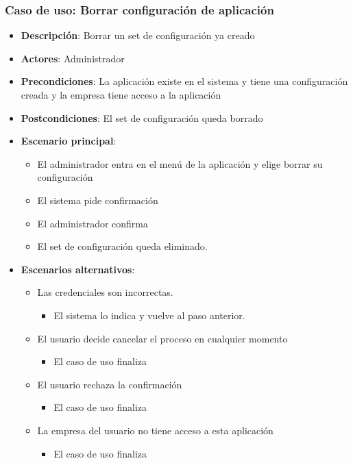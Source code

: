 \documentclass[12pt,a4paperpaper,]{report}
\providecommand{\tightlist}{%
  \setlength{\itemsep}{0pt}\setlength{\parskip}{0pt}}
\begin{document}
\subsubsection{Caso de uso: Borrar configuración de
aplicación}\label{caso-de-uso-borrar-configuraciuxf3n-de-aplicaciuxf3n-1}

\begin{itemize}
\tightlist
\item
  \textbf{Descripción}: Borrar un set de configuración ya creado
\item
  \textbf{Actores}: Administrador
\item
  \textbf{Precondiciones}: La aplicación existe en el sistema y tiene
  una configuración creada y la empresa tiene acceso a la aplicación
\item
  \textbf{Postcondiciones}: El set de configuración queda borrado
\item
  \textbf{Escenario principal}:

  \begin{itemize}
  \tightlist
  \item
    El administrador entra en el menú de la aplicación y elige borrar su
    configuración
  \item
    El sistema pide confirmación
  \item
    El administrador confirma
  \item
    El set de configuración queda eliminado.
  \end{itemize}
\item
  \textbf{Escenarios alternativos}:

  \begin{itemize}
  \tightlist
  \item
    Las credenciales son incorrectas.

    \begin{itemize}
    \tightlist
    \item
      El sistema lo indica y vuelve al paso anterior.
    \end{itemize}
  \item
    El usuario decide cancelar el proceso en cualquier momento

    \begin{itemize}
    \tightlist
    \item
      El caso de uso finaliza
    \end{itemize}
  \item
    El usuario rechaza la confirmación

    \begin{itemize}
    \tightlist
    \item
      El caso de uso finaliza
    \end{itemize}
  \item
    La empresa del usuario no tiene acceso a esta aplicación

    \begin{itemize}
    \tightlist
    \item
      El caso de uso finaliza
    \end{itemize}
  \end{itemize}
\end{itemize}
\end{document}
